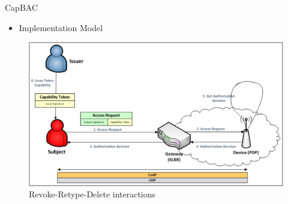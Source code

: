 \documentclass[xcolor=table]{beamer}
\begin{document}
\begin{frame}{CapBAC}
    \vfill
    \begin{itemize}
    \item Implementation Model 
    \end{itemize}
        \vfill
    \begin{figure}
		  \includegraphics[scale=0.5]{img/capBac.png}
		  \caption{Revoke-Retype-Delete interactions}
    \end{figure}
    \vfill
\end{frame}
\end{document}
